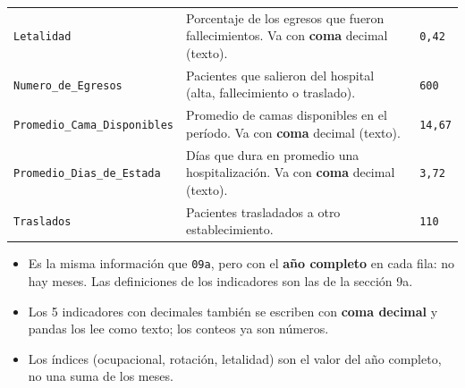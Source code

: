 \documentclass[10.5pt]{article}
\begin{document}
\begin{xltabular}{\linewidth}{@{}p{4.5cm} >{\raggedright\arraybackslash}X p{3.4cm}@{}}
\texttt{Letalidad} & Porcentaje de los egresos que fueron fallecimientos. Va con \textbf{coma} decimal (texto). & \texttt{0,42} \\
\texttt{Numero\_\allowbreak{}de\_\allowbreak{}Egresos} & Pacientes que salieron del hospital (alta, fallecimiento o traslado). & \texttt{600} \\
\texttt{Promedio\_\allowbreak{}Cama\_\allowbreak{}Disponibles} & Promedio de camas disponibles en el período. Va con \textbf{coma} decimal (texto). & \texttt{14,67} \\
\texttt{Promedio\_\allowbreak{}Dias\_\allowbreak{}de\_\allowbreak{}Estada} & Días que dura en promedio una hospitalización. Va con \textbf{coma} decimal (texto). & \texttt{3,72} \\
\texttt{Traslados} & Pacientes trasladados a otro establecimiento. & \texttt{110} \\
\end{xltabular}

\begin{alertabox}
\begin{itemize}[leftmargin=1.1em,itemsep=2pt,topsep=2pt]
\item Es la misma información que \texttt{09a}, pero con el \textbf{año completo} en cada fila: no hay meses. Las definiciones de los indicadores son las de la sección 9a.
\item Los 5 indicadores con decimales también se escriben con \textbf{coma decimal} y pandas los lee como texto; los conteos ya son números.
\item Los índices (ocupacional, rotación, letalidad) son el valor del año completo, no una suma de los meses.
\end{itemize}
\end{alertabox}
\end{document}
